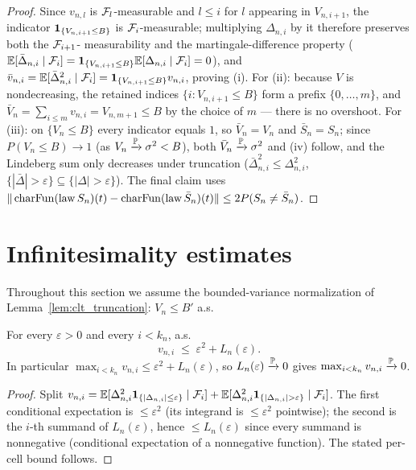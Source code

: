 \begin{proof}\leanok
Since $v_{n,l}$ is $\mathcal{F}_l$-measurable and $l\le i$ for $l$ appearing in
$V_{n,i+1}$, the indicator $\mathbf{1}_{\{V_{n,i+1}\le B\}}$ is $\mathcal{F}_i$-measurable;
multiplying $\Delta_{n,i}$ by it therefore preserves both the $\mathcal{F}_{i+1}$-%
measurability and the martingale-difference property
($\mathbb{E}[\bar\Delta_{n,i}\mid\mathcal{F}_i]=\mathbf{1}_{\{V_{n,i+1}\le B\}}\mathbb{E}[\Delta_{n,i}\mid\mathcal{F}_i]=0$),
and $\bar v_{n,i}=\mathbb{E}[\bar\Delta_{n,i}^2\mid\mathcal{F}_i]=\mathbf{1}_{\{V_{n,i+1}\le B\}}v_{n,i}$,
proving (i). For (ii): because $V$ is nondecreasing, the retained indices
$\{i:V_{n,i+1}\le B\}$ form a prefix $\{0,\dots,m\}$, and
$\bar V_n=\sum_{i\le m}v_{n,i}=V_{n,m+1}\le B$ by the choice of $m$ --- there is no
overshoot. For (iii): on $\{V_n\le B\}$ every indicator equals $1$, so $\bar
V_n=V_n$ and $\bar S_n=S_n$; since $P(V_n\le B)\to1$ (as
$V_n\xrightarrow{\mathbb{P}}\sigma^2<B$), both $\bar V_n\xrightarrow{\mathbb{P}}\sigma^2$ and
(iv) follow, and the Lindeberg sum only decreases under truncation
($\bar\Delta_{n,i}^2\le\Delta_{n,i}^2$, $\{|\bar\Delta|>\varepsilon\}\subseteq\{|\Delta|>\varepsilon\}$).
The final claim uses
$\|\operatorname{charFun}(\mathrm{law}\,S_n)(t)-\operatorname{charFun}(\mathrm{law}\,\bar S_n)(t)\|\le
2P(S_n\ne\bar S_n)$.
\end{proof}

\section{Infinitesimality estimates}
\label{sec:pre_clt_infl}

Throughout this section we assume the bounded-variance normalization of
Lemma~\ref{lem:clt_truncation}: $V_n\le B'$ a.s.

\begin{lemma}\label{lem:clt_max_var}
\leanok
For every $\varepsilon>0$ and every $i<k_n$, a.s.
\[
  v_{n,i}\;\le\;\varepsilon^2 + L_n(\varepsilon).
\]
In particular $\max_{i<k_n} v_{n,i}\le\varepsilon^2 + L_n(\varepsilon)$, so
$L_n(\varepsilon)\xrightarrow{\mathbb{P}}0$ gives $\max_{i<k_n}v_{n,i}\xrightarrow{\mathbb{P}}0$.
\end{lemma}

\begin{proof}\leanok
Split $v_{n,i}=\E[\Delta_{n,i}^2\indic_{\{|\Delta_{n,i}|\le\varepsilon\}}\mid\filt_i]
+\E[\Delta_{n,i}^2\indic_{\{|\Delta_{n,i}|>\varepsilon\}}\mid\filt_i]$. The first
conditional expectation is $\le\varepsilon^2$ (its integrand is $\le\varepsilon^2$
pointwise); the second is the $i$-th summand of $L_n(\varepsilon)$, hence
$\le L_n(\varepsilon)$ since every summand is nonnegative (conditional expectation
of a nonnegative function). The stated per-cell bound follows.
\end{proof}

